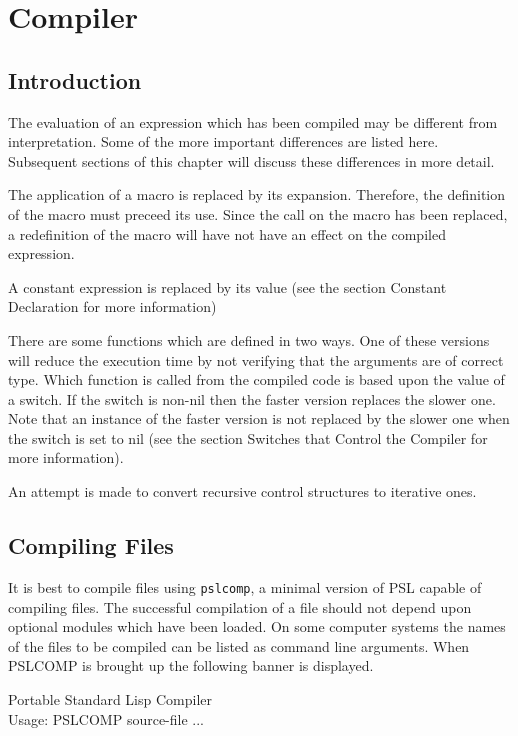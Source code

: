 
\chapter{Compiler}


\section{Introduction}

  The evaluation of an expression which has been compiled may be
different  from interpretation. Some of the more important
differences are listed here. Subsequent  sections  of  this
chapter will discuss these differences in more detail.

  The  application  of  a  macro  is  replaced by its expansion.
Therefore, the definition of the macro  must  preceed  its  use.
Since the call on the macro has been replaced, a redefinition of
the  macro  will  have  not  have  an  effect on the compiled
expression.

  A constant expression  is  replaced  by  its value (see  the
section Constant Declaration for more information)

  There are some functions which are defined in two ways. One of
these  versions  will reduce the execution time by not verifying
that the arguments are of  correct  type.  Which function is
called  from  the  compiled  code  is  based upon the value of a
switch.  If the  switch  is  non-nil  then  the  faster  version
replaces  the  slower  one.  Note that an instance of the faster
version is not replaced by the slower one when the switch is set
to nil (see the section Switches that Control the  Compiler  for
more information).

  An  attempt is made to convert recursive control structures to
iterative ones.

\section{Compiling Files}

It is best to compile files using {\tt pslcomp}, a minimal version
of PSL capable of compiling files. The successful compilation of
a  file  should not depend upon optional modules which have been
loaded.  On some computer systems the names of the files  to  be
compiled  can  be listed as command line arguments. When PSLCOMP
is brought up the following banner is displayed.

Portable Standard Lisp Compiler\\
Usage: PSLCOMP source-file ...

